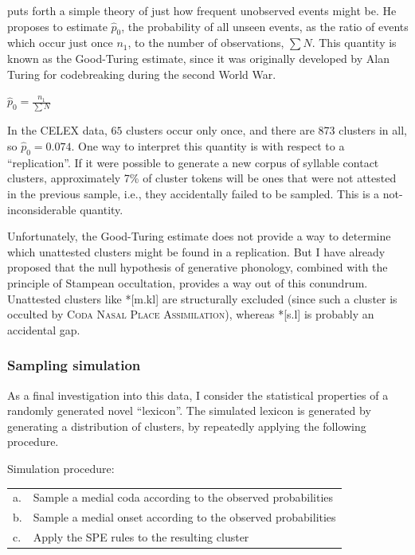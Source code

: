 \citet{Good1953} puts forth a simple theory of just how frequent unobserved events might be. He proposes to estimate $\hat{p}_0$, the probability of all unseen events, as the ratio of events which occur just once $n_1$, to the number of observations, $\sum N$. This quantity is known as the Good-Turing estimate, since it was originally developed by Alan Turing for codebreaking during the second World War.

\begin{example}
$\displaystyle \hat{p}_0 = \frac{n_1}{\sum N}$ 
\end{example}

\noindent
In the CELEX data, $65$ clusters occur only once, and there are 873 clusters in all, so $\hat{p}_0 = 0.074$. One way to interpret this quantity is with respect to a ``replication''. If it were possible to generate a new corpus of syllable contact clusters, approximately 7\% of cluster tokens will be ones that were not attested in the previous sample, i.e., they accidentally failed to be sampled. This is a not-inconsiderable quantity. 

Unfortunately, the Good-Turing estimate does not provide a way to determine which unattested clusters might be found in a replication. But I have already proposed that the null hypothesis of generative phonology, combined with the principle of Stampean occultation, provides a way out of this conundrum. Unattested clusters like *[m.kl] are structurally excluded (since such a cluster is occulted by \textsc{Coda Nasal Place Assimilation}), whereas *[s.l] is probably an accidental gap.

\subsubsection{Sampling simulation}

As a final investigation into this data, I consider the statistical properties of a randomly generated novel ``lexicon''. The simulated lexicon is generated by  generating a distribution of clusters, by repeatedly applying the following procedure.

\begin{example}
Simulation procedure: \\
    \begin{tabular}{l l}
    a. & Sample a medial coda according to the observed probabilities  \\
    b. & Sample a medial onset according to the observed probabilities \\
    c. & Apply the SPE rules to the resulting cluster                  \\
    \end{tabular}
\end{example}

